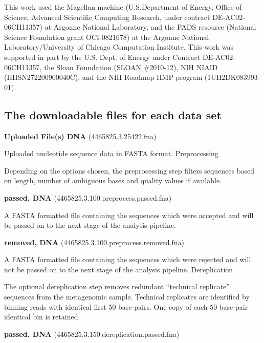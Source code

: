 \documentclass[12pt,fullpage]{report}
\begin{document}
This work used the Magellan machine (U.S.Department of Energy, Office of Science, 
Advanced Scientific Computing Research, under contract  DE-AC02-06CH11357) at Argonne National Laboratory, and the PADS resource (National Science Foundation grant OCI-0821678) at the Argonne National Laboratory/University of Chicago Computation Institute. This work was supported in part by the U.S. Dept. of Energy under Contract DE-AC02-06CH11357, the Sloan Foundation (SLOAN \#2010-12), NIH NIAID (HHSN272200900040C), and the NIH Roadmap HMP program (1UH2DK083993-01).
\begin{appendices}
\chapter{The downloadable files for each data set}
\label{chapter:downloads}

\begin{mdframed}
\textbf{Uploaded File(s) DNA} (4465825.3.25422.fna)

Uploaded nucleotide sequence data in FASTA format.
Preprocessing

Depending on the options chosen, the preprocessing step filters sequences based on length, number of ambiguous bases and quality values if available.

\textbf{passed, DNA} (4465825.3.100.preprocess.passed.fna)

A FASTA formatted file containing the sequences which were accepted and will be passed on to the next stage of the analysis pipeline.

\textbf{removed, DNA} (4465825.3.100.preprocess.removed.fna)

A FASTA formatted file containing the sequences which were rejected and will not be passed on to the next stage of the analysis pipeline.
Dereplication

The optional dereplication step removes redundant ``technical replicate'' sequences from the metagenomic sample. Technical replicates are identified by binning reads with identical first 50 base-pairs. One copy of each 50-base-pair identical bin is retained.

\textbf{passed, DNA} (4465825.3.150.dereplication.passed.fna)


\end{mdframed}
\end{appendices}
\end{document}
